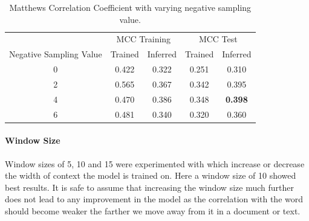 \begin{table}[h]
  \begin{center}
    \begin{tabular}{ c | *2c | *2c }
      \toprule
       & \multicolumn{2}{c|}{MCC Training} & \multicolumn{2}{|c}{MCC Test}\\
      Negative Sampling Value & Trained & Inferred & Trained & Inferred \\
      \midrule
      0 & 0.422 & 0.322 & 0.251 & 0.310 \\
      2 & 0.565 & 0.367 & 0.342 & 0.395 \\
      4 & 0.470 & 0.386 & 0.348 & \textbf{0.398} \\
      6 & 0.481 & 0.340 & 0.320 & 0.360 \\
    \bottomrule
  \end{tabular}
  \caption{Matthews Correlation Coefficient with varying negative sampling value.}
\label{tab:Paragraph Vector Parameter Results Negative Sampling}
\end{center}
\end{table}

\paragraph{Window Size}
Window sizes of 5, 10 and 15 were experimented with which increase or decrease the width of context the model is trained on. Here a window size of 10 showed best results. It is safe to assume that increasing the window size much further does not lead to any improvement in the model as the correlation with the word should become weaker the farther we move away from it in a document or text.


